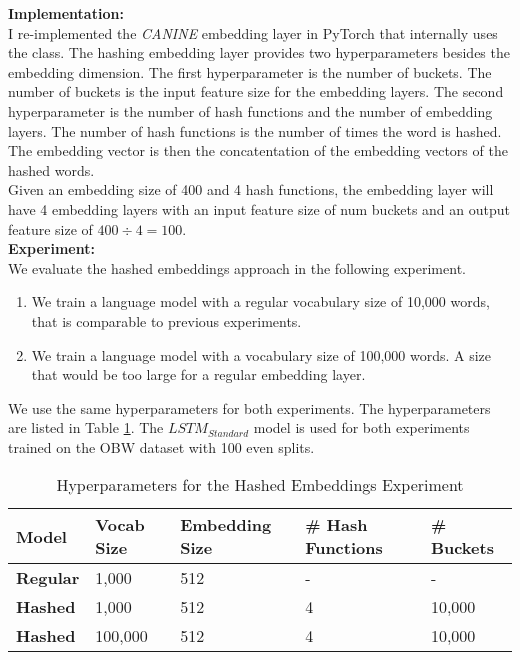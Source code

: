\documentclass[11pt]{article}
\begin{document}
\textbf{Implementation:}\\
I re-implemented the \textit{CANINE} embedding layer in PyTorch that internally uses the 
class. The hashing embedding layer provides two hyperparameters besides the embedding dimension.
The first hyperparameter is the number of buckets. The number of buckets is the input feature size 
for the embedding layers. The second hyperparameter is the number of
hash functions and the number of embedding layers. The number of hash functions is the number of times the word is hashed. The
embedding vector is then the concatentation of the embedding vectors of the hashed words.\\

Given an embedding size of 400 and 4 hash functions, the embedding layer will have 4 embedding layers
with an input feature size of num buckets and an output feature size of $400 \div 4 = 100$.\\

\textbf{Experiment:}\\
We evaluate the hashed embeddings approach in the following experiment. 

\begin{enumerate}
    \item We train a language model with a regular vocabulary size of 10,000 words, that is comparable
    to previous experiments.
    \item We train a language model with a vocabulary size of 100,000 words. A size that would be
    too large for a regular embedding layer.
\end{enumerate}

We use the same hyperparameters for both experiments. The hyperparameters are listed in
Table \ref{tab:hashed-embeddings-hyperparameters}. The $LSTM_{Standard}$ model is used for both experiments 
trained on the OBW dataset with 100 even splits.\\

\begin{table}[h]
\centering
\begin{tabular}{|l|l|l|l|l|}
\hline
\textbf{Model} & \textbf{Vocab Size} & \textbf{Embedding Size} & \textbf{\# Hash Functions} & \textbf{\# Buckets} \\ \hline
\textbf{Regular} & 1,000 & 512 & - & -      \\ \hline
\textbf{Hashed}  & 1,000  & 512 & 4 & 10,000 \\ \hline
\textbf{Hashed}  & 100,000 & 512 & 4 & 10,000 \\ \hline
\end{tabular}
\caption{Hyperparameters for the Hashed Embeddings Experiment}
\label{tab:hashed-embeddings-hyperparameters}
\end{table}
\end{document}
